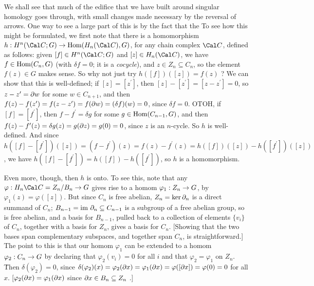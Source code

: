 We shall see that much of the edifice that we have built around singular homology
goes through, with small changes made necessary by the reversal of arrows. One way
to see a large part of this is by the fact that the  To see how this might be formulated, we first note that there is a 
homomorphism $h:H^n({\Cal C};G)\ra \Hom(H_n({\Cal C}),G)$, for any chain complex ${\Cal C}$, 
defined as follows: given $[f]\in H^n({\Cal C};G)$ and $[z]\in H_n({\Cal C})$,
we have $f\in \text{Hom}(C_n,G)$ (with $\delta f = 0$; it is a {\it cocycle}),
and $z\in Z_n\subseteq C_n$, so the element $f(z)\in G$
makes sense. So why not just try $h([f])([z]) = f(z)$ ? We can show that this is
well-defined; if $[z]=[z^\prime]$, then $[z]-[z^\prime] = [z-z^\prime]=0$, so 
$z-z^\prime=\partial w$ for some $w\in C_{n+1}$, and then 
$f(z)-f(z^\prime) = f(z-z^\prime)=f(\partial w) = (\delta f)(w)=0$, since
$\delta f = 0$. OTOH, if $[f]=[f^\prime]$, then $f-f^\prime = \delta g$ 
for some $g\in \text{Hom}(C_{n-1},G)$, and then 
$f(z)-f^\prime(z) = \delta g(z) = g(\partial z) = g(0)=0$, since $z$ is an $n$-cycle.
So $h$ is well-defined. And since 
$h([f]-[f^\prime])([z]) = (f-f^\prime)(z) = f(z)-f^\prime(z) = 
h([f])([z]) - h([f^\prime])([z])$, we have $h([f]-[f^\prime]) = h([f])-h([f^\prime])$,
so $h$ is a homomorphism. 

\ssk

Even more, though,  then $h$ is onto. 
To see this, note that any 
$\varphi:H_n{\Cal C}=Z_n/B_n\ra G$ gives rise to a homom $\varphi_1:Z_n\rightarrow G$,
by $\varphi_1(z)=\varphi([z])$. But since $C_n$ is free abelian, $Z_n=\ker \partial_n$ 
is a direct summand of $C_n$; $B_{n-1}=\text{im}\ \partial_n\subseteq C_{n-1}$ is a 
subgroup of a free 
abelian group, so is free abelian, and a basis for $B_{n-1}$, pulled back 
to a collection of elements $\{v_i\}$ of $C_n$, together with
a basis for $Z_n$, gives a basis for $C_n$. [Showing that the two bases span complementary
subspaces, and together span $C_n$, is straightforward.] The point to this is that
our homom $\varphi_1$ can be extended to a homom $\varphi_2:C_n\rightarrow G$ by declaring
that $\varphi_2(v_i)=0$ for all $i$ and that $\varphi_2=\varphi_1$ on $Z_n$. \u{Then}
$\delta(\varphi_2)=0$, since 
$\delta(\varphi_2)(x)=\varphi_2(\partial x) = \varphi_1(\partial x) = \varphi([\partial x]) = \varphi(0)=0$
for all $x$. [$\varphi_2(\partial x) = \varphi_1(\partial x)$ since $\partial x\in B_n\subseteq Z_n$ .]

\vfill
\eject

